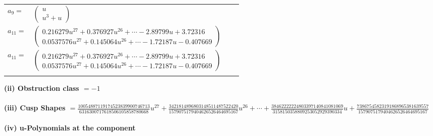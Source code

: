 \documentclass[1p]{elsarticle_modified}
\theoremstyle{definition}
\begin{document}
\begin{tabular}{m{7pt} m{180pt} m{7pt} m{180pt} }
\flushright $a_{9}=$&$\begin{pmatrix}u\\u^3+u\end{pmatrix}$ \\
\flushright $a_{11}=$&$\begin{pmatrix}0.216279 u^{27}+0.376927 u^{26}+\cdots-2.89799 u+3.72316\\0.0537576 u^{27}+0.145064 u^{26}+\cdots-1.72187 u-0.407669\end{pmatrix}$\\ \flushright $a_{11}=$&$\begin{pmatrix}0.216279 u^{27}+0.376927 u^{26}+\cdots-2.89799 u+3.72316\\0.0537576 u^{27}+0.145064 u^{26}+\cdots-1.72187 u-0.407669\end{pmatrix}$\\&\end{tabular}
\flushleft \textbf{(ii) Obstruction class $= -1$}\\~\\
\flushleft \textbf{(iii) Cusp Shapes $= \frac{10054887119174523839900746713}{6316300717618506105858780668} u^{27}+\frac{3421814896803148511487522420}{1579075179404626526464695167} u^{26}+\cdots+\frac{38462222224803397140841081069}{3158150358809253052929390334} u+\frac{73867545823191868965381639557}{1579075179404626526464695167}$}\\~\\
\newpage\renewcommand{\arraystretch}{1}
\flushleft \textbf{(iv) u-Polynomials at the component}\newline \\
\end{document}
